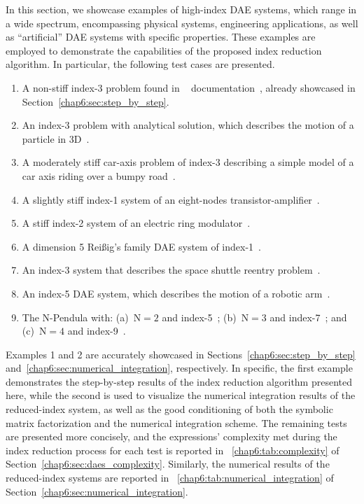 In this section, we showcase examples of high-index \ac{DAE} systems, which range in a wide spectrum, encompassing physical systems, engineering applications, as well as ``artificial'' \ac{DAE} systems with specific properties. These examples are employed to demonstrate the capabilities of the proposed index reduction algorithm. In particular, the following test cases are presented.
%
\begin{enumerate}
  \item A non-stiff index-3 problem found in \Wolfram{}~\Mathematica{} documentation~\cite{mathematica}, already showcased in Section~\ref{chap6:sec:step_by_step}.
  \item An index-3 problem with analytical solution, which describes the motion of a particle in 3D~\cite{campbell1995constraint}.
  \item A moderately stiff car-axis problem of index-3 describing a simple model of a car axis riding over a bumpy road~\cite{lioen1998test, mazzia2008test}.
  \item A slightly stiff index-1 system of an eight-nodes transistor-amplifier~\cite{lioen1998test, mazzia2008test}.
  \item A stiff index-2 system of an electric ring modulator~\cite{lioen1998test, mazzia2008test}.
  \item A dimension 5 Rei{\ss}ig's family \ac{DAE} system of index-1~\cite{reissig2000differential}.
  \item An index-3 system that describes the space shuttle reentry problem~\cite{brenan1995numerical}.
  \item An index-5 \ac{DAE} system, which describes the motion of a robotic arm~\cite{pryce1998solving}.
  \item The $\mathrm{N}$-Pendula with: (a)~$\mathrm{N} = 2$ and index-5~\cite{pryce1998solving}; (b)~$\mathrm{N} = 3$ and index-7~\cite{nedialkov2008solvingIII}; and (c)~$\mathrm{N} = 4$ and index-9~\cite{nedialkov2008solvingIII}.
\end{enumerate}
%
Examples 1 and 2 are accurately showcased in Sections~\ref{chap6:sec:step_by_step} and~\ref{chap6:sec:numerical_integration}, respectively. In specific, the first example demonstrates the step-by-step results of the index reduction algorithm presented here, while the second is used to visualize the numerical integration results of the reduced-index system, as well as the good conditioning of both the symbolic matrix factorization and the numerical integration scheme. The remaining tests are presented more concisely, and the expressions' complexity met during the index reduction process for each test is reported in \tablename{}~\ref{chap6:tab:complexity} of Section~\ref{chap6:sec:daes_complexity}. Similarly, the numerical results of the reduced-index systems are reported in \tablename{}~\ref{chap6:tab:numerical_integration} of Section~\ref{chap6:sec:numerical_integration}.

